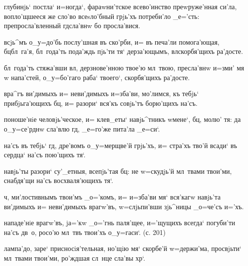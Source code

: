 


  глубинjь` постла` и=ногда`, 
фараwни'тское всево'инство преwруже'нная си'ла, 
вопло'щшееся же сло'во всеsло'бный грjь'хъ потреби'ло 
_е='сть: препросла'вленный гд сла'внw бо просла'вися.

 всjь^мъ о_у=до'бь послу'шная въ ско'рби, и= 
въ печа'ли помога'ющая, бц бл~га'я, бл~года'ть 
пода'ждь пjь'ти тя` дерза'ющымъ, вл скорбя'щихъ 
ра'досте.

 бл~года'ть стяжа'вши вл, 
дерзнове'нною твое'ю мл~твою, пресла'внw и=зми' мя w\т 
напа'стей, о_у=бо'гаго раба` твоего`, скорбя'щихъ 
ра'досте.

 вра^гъ ви'димыхъ и= неви'димыхъ 
и=зба'ви, мо'лимся, къ тебjь` прибjьга'ющихъ бц, и= 
разори` вся'къ совjь'тъ борю'щихъ на'съ.

   поноше'нiе человjь'ческое, и= 
клев_еты` навjь^тникъ w\т мене`, бц, молю' тя: да 
о_у=се'рднw сла'влю гд, _е=го'же пита'ла _е=си`.


  на'съ въ тебjь` гд, 
дре'вомъ о_у=мерщве'й грjь'хъ, и= стра'хъ тво'й всади` въ 
сердца` на'съ пою'щихъ тя`.

 навjь'ты разори` су'_етныя, всепjь'тая 
бц: не w=скудjь'й мл~твами твои'ми, снабдя'щи на'съ 
восхваля'ющихъ тя`.

 ч, ми'лостивнымъ твои'мъ _о='комъ, и= 
и=зба'ви мя` вся'кагw навjь'та ви'димыхъ и= неви'димыхъ 
врагw'въ, w=слjьпи'вши зjь^ницы _о=че'съ и='хъ.

  нападе'нiе врагw'въ, jа='кw _о='гнь 
паля'щее, и='щущихъ всегда` погуби'ти на'съ дв~о, росо'ю 
мл~твъ твои'хъ о_у=гаси`. (с. 201)

   лампа'до, заре` 
присносiя'тельная, но'щiю мя` скорбе'й w=держи'ма, 
просвjьти` мл~твами твои'ми, ро'ждшая сл~нце сла'вы 
хр`.

